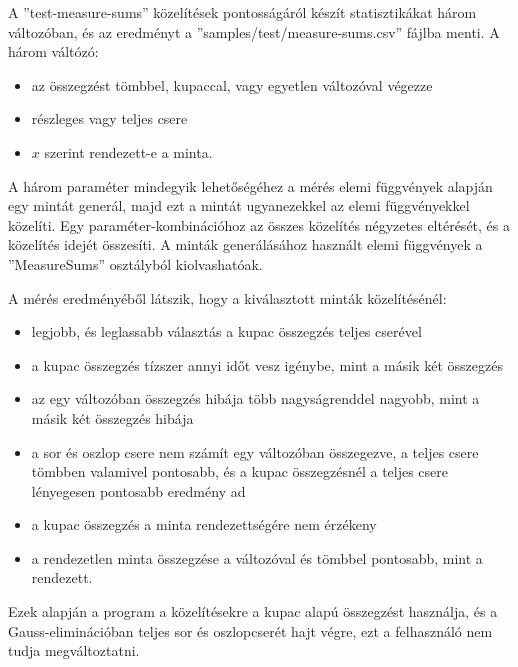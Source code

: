 A ''test-measure-sums'' közelítések pontosságáról készít statisztikákat három változóban, és az eredményt a ''samples/test/measure-sums.csv'' fájlba menti. A három váltózó:
\begin{itemize}
\item az összegzést tömbbel, kupaccal, vagy egyetlen változóval végezze
\item részleges vagy teljes csere
\item $x$ szerint rendezett-e a minta.
\end{itemize}
A három paraméter mindegyik lehetőségéhez a mérés elemi függvények alapján egy mintát generál, majd ezt a mintát ugyanezekkel az elemi függvényekkel közelíti.
Egy paraméter-kombinációhoz az összes közelítés négyzetes eltérését, és a közelítés idejét összesíti.
A minták generálásához használt elemi függvények a ''MeasureSums'' osztályból kiolvashatóak.

A mérés eredményéből látszik, hogy a kiválasztott minták közelítésénél:
\begin{itemize}
\item legjobb, és leglassabb választás a kupac összegzés teljes cserével
\item a kupac összegzés tízszer annyi időt vesz igénybe, mint a másik két összegzés
\item az egy változóban összegzés hibája több nagyságrenddel nagyobb, mint a másik két összegzés hibája
\item a sor és oszlop csere nem számít egy változóban összegezve, a teljes csere tömbben valamivel pontosabb, és a kupac összegzésnél a teljes csere lényegesen pontosabb eredmény ad
\item a kupac összegzés a minta rendezettségére nem érzékeny
\item a rendezetlen minta összegzése a változóval és tömbbel pontosabb, mint a rendezett.
\end{itemize}
Ezek alapján a program a közelítésekre a kupac alapú összegzést használja, és a Gauss-eliminációban teljes sor és oszlopcserét hajt végre, ezt a felhasználó nem tudja megváltoztatni.

